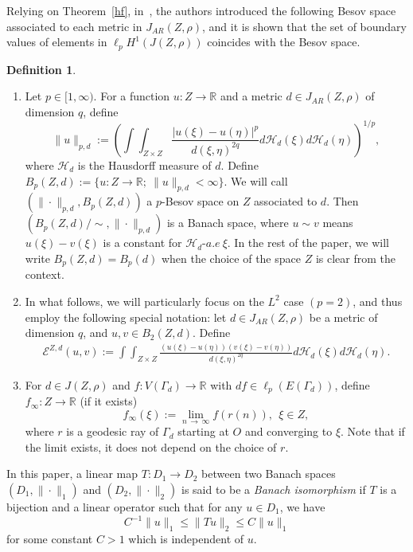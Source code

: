 \documentclass[10pt]{amsart}
\theoremstyle{definition}\newtheorem{defi}[theo]{Definition}\newtheorem{rema}[theo]{Remark}\newtheorem{exam}[theo]{Example}\newtheorem{exem}[theo]{Example}\newtheorem{nota}[theo]{Notation}
\newcommand{\ce}{\mathcal{E}}
\newcommand{\ch}{\mathcal{H}}
\newcommand{\br}{\mathbb{R}}
\begin{document}
Relying on Theorem~\ref{hf}, in~\cite{BP}, the authors introduced the following Besov space associated to each metric in $J_{AR}(Z,\rho)$, and it is shown that the set of boundary values of elements in $\ell_pH^1(J(Z,\rho))$ coincides with the Besov space.

\begin{defi}\label{def1}\leavevmode
\begin{enumerate}
\item\label{defi4.5.1} Let $p\in[1,\infty)$. For a function $u:Z\rightarrow\br$ and a metric $d\in J_{AR}(Z,\rho)$ of dimension $q$, define
\begin{equation*}
\|u\|_{p,d}:=\left(\int\int_{Z\times Z}\frac{|u(\xi)-u(\eta)|^p}{d(\xi,\eta)^{2q}}d\ch_{d}(\xi)d\ch_{d}(\eta)\right)^{1/p},
\end{equation*}
where $\ch_{d}$ is the Hausdorff measure of $d$. Define $B_p(Z,d):=\{u:Z\rightarrow\br;\ \|u\|_{p,d}<\infty\}$. We will call $(\|\cdot\|_{p,d},B_p(Z,d))$ a $p$-Besov space on $Z$ associated to $d$. Then $(B_p(Z,d)/\sim,\|\cdot\|_{p,d})$ is a Banach space, where $u\sim v$ means $u(\xi)-v(\xi)$ is a constant for $\ch_{d}$-$a.e\
\xi$. In the rest of the paper, we will write $B_p(Z,d)=B_p(d)$ when the choice of the space $Z$ is clear from the context.
\item\label{defi4.5.2} In what follows, we will particularly focus on the $L^2$ case $(p=2)$, and thus employ the following special notation: let $d\in J_{AR}(Z,\rho)$ be a metric of dimension $q$, and $u,v\in B_2(Z,d)$. Define
\begin{align*}
\ce^{Z,d}(u,v):=\int\int_{Z\times Z}\frac{(u(\xi)-u(\eta))(v(\xi)-v(\eta))}{d(\xi,\eta)^{2q}} d\ch_{d}(\xi)d\ch_{d}(\eta).
\end{align*}
\item\label{defi4.5.3} For $d\in J(Z,\rho)$ and $f:V(\Gamma_{d})
\rightarrow\br$ with $df\in\ell_p(E(\Gamma_{d}))$, define $f_{\infty}:Z\to\br$ (if it exists)
\begin{equation*}
f_{\infty}(\xi):=\lim_{n\,\to\,\infty}f(r(n)),\ \ \xi\in Z,
\end{equation*}
where $r$ is a geodesic ray of $\Gamma_{d}$ starting at $O$ and converging to $\xi$. Note that if the limit exists, it does not depend on the choice of $r$.
\end{enumerate}
\end{defi}

In this paper, a linear map $T:D_1\to D_2$ between two Banach spaces $(D_1,\|\cdot\|_1)$ and $(D_2,\|\cdot\|_2)$ is said to be a \emph{Banach isomorphism} if $T$ is a bijection and a linear operator such that for any $u\in D_1$, we have
\[
C^{-1}\|u\|_1\leq\|Tu\|_2\leq C\|u\|_1
\]
for some constant $C>1$ which is independent of $u$.
\end{document}
